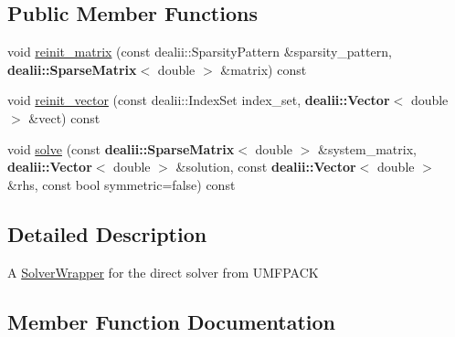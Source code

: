 \subsection*{Public Member Functions}
\begin{DoxyCompactItemize}
\item 
void \hyperlink{classincremental_f_e_1_1_solver_wrapper_u_m_f_p_a_c_k_ac3fc4de28b82a44cb570a45c1a8f36fe}{reinit\+\_\+matrix} (const dealii\+::\+Sparsity\+Pattern \&sparsity\+\_\+pattern, {\bf dealii\+::\+Sparse\+Matrix}$<$ double $>$ \&matrix) const 
\item 
void \hyperlink{classincremental_f_e_1_1_solver_wrapper_u_m_f_p_a_c_k_a63faea4f5b3c02a491d56605428b60fc}{reinit\+\_\+vector} (const dealii\+::\+Index\+Set index\+\_\+set, {\bf dealii\+::\+Vector}$<$ double $>$ \&vect) const 
\item 
void \hyperlink{classincremental_f_e_1_1_solver_wrapper_u_m_f_p_a_c_k_aac57d12feba760491fb65a15808ce621}{solve} (const {\bf dealii\+::\+Sparse\+Matrix}$<$ double $>$ \&system\+\_\+matrix, {\bf dealii\+::\+Vector}$<$ double $>$ \&solution, const {\bf dealii\+::\+Vector}$<$ double $>$ \&rhs, const bool symmetric=false) const 
\end{DoxyCompactItemize}


\subsection{Detailed Description}
A \hyperlink{classincremental_f_e_1_1_solver_wrapper}{Solver\+Wrapper} for the direct solver from U\+M\+F\+P\+A\+CK 

\subsection{Member Function Documentation}
